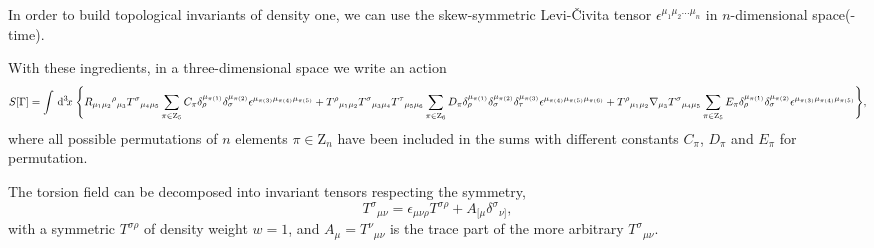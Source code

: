 \documentclass[twocolumn,aps,
  showpacs,showkeys,prd,superscriptaddress]{revtex4-1}
\begin{document}
In order to build topological invariants of density one, we can use the skew-symmetric Levi-\v{C}ivita tensor $\epsilon^{\mu_1\mu_2\dots\mu_n}$ in $n$-dimensional space(-time).

\begin{widetext}
  With these ingredients, in a three-dimensional space we write an action 
  \begin{dmath}
    \label{accion3d}
    S[\Gamma] =
    \int \dn{3}{x}  \Bigg\{ R_{\mu_1\mu_2}{}^\rho{}_{\mu_3} T^\sigma{}_{\mu_4\mu_5} \sum_{\pi \in  \mathrm{Z}_5}C_\pi\delta_\rho^{\mu_{\pi(1)}} \delta_\sigma^{\mu_{\pi(2)}} \epsilon^{\mu_{\pi(3)}\mu_{\pi(4)}\mu_{\pi(5)}}  + T^\rho{}_{\mu_1\mu_2} T^\sigma{}_{\mu_3\mu_4} T^\tau{}_{\mu_5\mu_6} \sum_{\pi \in \mathrm{Z}_6}D_\pi\delta_\rho^{\mu_{\pi(1)}} \delta_\sigma^{\mu_{\pi(2)}}\delta_\tau^{\mu_{\pi(3)}}\epsilon^{\mu_{\pi(4)}\mu_{\pi(5)}\mu_{\pi(6)}} + T^\rho{}_{\mu_1\mu_2}\nabla_{\mu_3} T^\sigma{}_{\mu_4\mu_5}\sum_{\pi \in \mathrm Z_5}E_\pi\delta_\rho^{\mu_{\pi(1)}} \delta_\sigma^{\mu_{\pi(2)}}\epsilon^{\mu_{\pi(3)}\mu_{\pi(4)}\mu_{\pi(5)}} \Bigg\}, 
  \end{dmath}
  where all possible permutations of $n$ elements $\pi \in \mathrm{Z}_n$ have been included in the sums with  different constants $C_\pi$, $D_\pi$ and $E_\pi$ for  permutation. 
\end{widetext}

The torsion field can be decomposed into invariant tensors respecting the symmetry,
\begin{equation}
  T^\sigma{}_{\mu\nu} = \epsilon_{\mu\nu\rho} T^{\sigma\rho} + A_{[\mu}\delta^\sigma{}_{\nu]},
\end{equation}
with a symmetric $T^{\sigma\rho}$ of density weight  $w = 1$, and \mbox{$A_\mu = T^\nu{}_{\mu\nu}$} is the trace part of the more arbitrary $T^\sigma{}_{\mu\nu}$.
\end{document}
